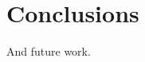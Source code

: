 \documentclass{vldb}
\begin{document}














\section{Conclusions}
\label{sec:conclusions}

And future work.

\end{document}

